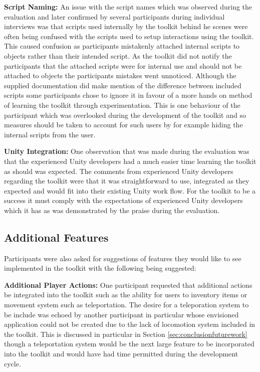 \documentclass{l4proj}
\begin{document}
\textbf{Script Naming:} An issue with the script names which was observed during the evaluation and later confirmed by several participants during individual interviews was that scripts used internally by the toolkit behind he scenes were often being confused with the scripts used to setup interactions using the toolkit. This caused confusion as participants mistakenly attached internal scripts to objects rather than their intended script. As the toolkit did not notify the participants that the attached scripts were for internal use and should not be attached to objects the participants mistakes went unnoticed. Although the supplied documentation did make mention of the difference between included scripts some participants chose to ignore it in favour of a more hands on method of learning the toolkit through experimentation. This is one behaviour of the participant which was overlooked during the development of the toolkit and so measures should be taken to account for such users by for example hiding the internal scripts from the user. 

\textbf{Unity Integration:} One observation that was made during the evaluation was that the experienced Unity developers had a much easier time learning the toolkit as should was expected. The comments from experienced Unity developers regarding the toolkit were that it was straightforward to use, integrated as they expected and would fit into their existing Unity work flow. For the toolkit to be a success it must comply with the expectations of experienced Unity developers which it has as was demonstrated by the praise during the evaluation. 

\subsection{Additional Features}
Participants were also asked for suggestions of features they would like to see implemented in the toolkit with the following being suggested:

\textbf{Additional Player Actions:} One participant requested that additional actions be integrated into the toolkit such as the ability for users to inventory items or movement system such as teleportation. The desire for a teleporation system to be include was echoed by another participant in particular whose envisioned application could not be created due to the lack of locomotion system included in the toolkit. This is discussed in particular in Section \ref{sec:conclusionfuturework} though a teleportation system would be the next large feature to be incorporated into the toolkit and would have had time permitted during the development cycle.  
\end{document}

